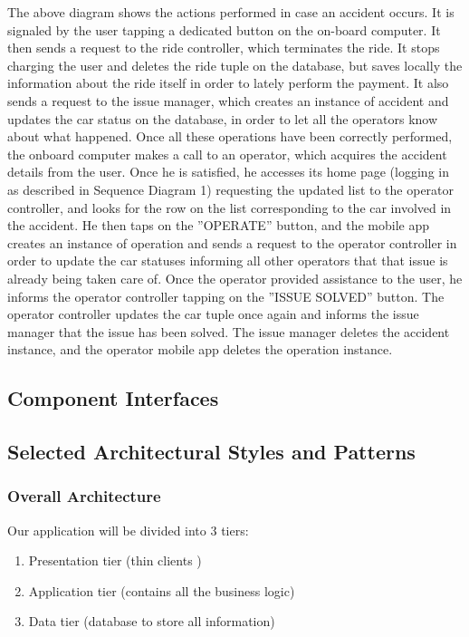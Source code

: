 \documentclass{article}
\begin{document}
\begin{flushleft}
The above diagram shows the actions performed in case an accident occurs. It is signaled by the user tapping a dedicated button on the on-board computer. It then sends a request to the ride controller, which terminates the ride. It stops charging the user and deletes the ride tuple on the database, but saves locally the information about the ride itself in order to lately perform the payment. It also sends a request to the issue manager, which creates an instance of accident and updates the car status on the database, in order to let all the operators know about what happened. Once all these operations have been correctly performed, the onboard computer makes a call to an operator, which acquires the accident details from the user. Once he is satisfied, he accesses its home page (logging in as described in Sequence Diagram 1) requesting the updated list to the operator controller, and looks for the row on the list corresponding to the car involved in the accident. He then taps on the ''OPERATE'' button, and the mobile app creates an instance of operation and sends a request to the operator controller in order to update the car statuses informing all other operators that that issue is already being taken care of. Once the operator provided assistance to the user, he informs the operator controller tapping on the ''ISSUE SOLVED'' button. The operator controller updates the car tuple once again and informs the issue manager that the issue has been solved. The issue manager deletes the accident instance, and the operator mobile app deletes the operation instance.


\newpage

\subsection{Component Interfaces} %

\subsection{Selected Architectural Styles and Patterns} %
\subsubsection{Overall Architecture}
Our application will be divided into 3 tiers:\\
\begin{enumerate}
\item Presentation tier (thin clients )
\item Application tier (contains all the business logic)
\item Data tier (database to store all information)
\end{enumerate}

\end{flushleft}
\end{document}
